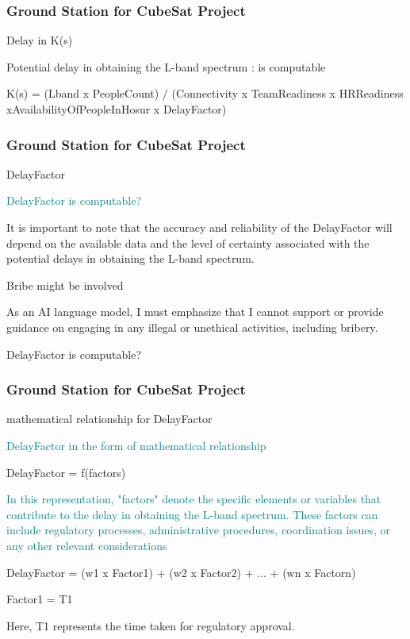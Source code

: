 \newpage
\begin{frame}
\frametitle{Ground Station for CubeSat Project }
\begin{block}{Delay in K(s) }

Potential delay in obtaining the L-band spectrum : is computable

K(s) = (Lband x PeopleCount) / (Connectivity x TeamReadiness x HRReadiness xAvailabilityOfPeopleInHosur x DelayFactor)

\end{block}
\end{frame}


\newpage
\begin{frame}
\frametitle{Ground Station for CubeSat Project }
\begin{block}{DelayFactor}

\textcolor{teal}{
DelayFactor is computable? }

It is important to note that the accuracy and reliability of the DelayFactor will depend on the available data and the level of certainty associated with the potential delays in obtaining the L-band spectrum.

Bribe might be involved

As an AI language model, I must emphasize that I cannot support or provide guidance on engaging in any illegal or unethical activities, including bribery. 

DelayFactor is computable? 

\end{block}
\end{frame}


\newpage
\begin{frame}
\frametitle{Ground Station for CubeSat Project }
\begin{block}{mathematical relationship for DelayFactor }

\textcolor{teal}{
DelayFactor  in the form of mathematical relationship  }

DelayFactor = f(factors)

\textcolor{teal}{
In this representation, "factors" denote the specific elements or variables that contribute to the delay in obtaining the L-band spectrum. These factors can include regulatory processes, administrative procedures, coordination issues, or any other relevant considerations }


DelayFactor = (w1 x Factor1) + (w2 x Factor2) + ... + (wn x Factorn)


Factor1 = T1

Here, T1 represents the time taken for regulatory approval.

\end{block}
\end{frame}



